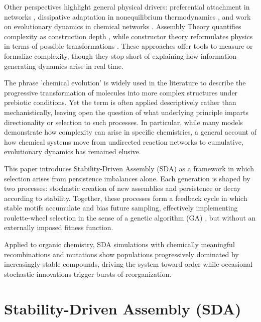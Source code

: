 \documentclass[life,article,submit,pdftex,moreauthors]{Definitions/mdpi}
\begin{document}
Other perspectives highlight general physical drivers: preferential attachment in networks \cite{barabasi1999emergence}, dissipative adaptation in nonequilibrium thermodynamics \cite{prigogine1977self, england2015dissipative}, and work on evolutionary dynamics in chemical networks \cite{wu2012origin, nowak2006evolutionary}. Assembly Theory quantifies complexity as construction depth \cite{walker2023nature}, while constructor theory reformulates physics in terms of possible transformations \cite{deutsch2013constructor}. These approaches offer tools to measure or formalize complexity, though they stop short of explaining how information-generating dynamics arise in real time.

The phrase 'chemical evolution' is widely used in the literature to describe the progressive transformation of molecules into more complex structures under prebiotic conditions. Yet the term is often applied descriptively rather than mechanistically, leaving open the question of what underlying principle imparts directionality or selection to such processes. In particular, while many models demonstrate how complexity can arise in specific chemistries, a general account of how chemical systems move from undirected reaction networks to cumulative, evolutionary dynamics has remained elusive.

This paper introduces Stability-Driven Assembly (SDA) as a framework in which 
selection arises from persistence imbalances alone. Each generation is shaped 
by two processes: stochastic creation of new assemblies and persistence or 
decay according to stability. Together, these processes form a feedback cycle
in which stable motifs accumulate and bias future sampling, effectively implementing roulette-wheel selection in the sense of a genetic algorithm (GA) 
\cite{holland1975adaptation, adler1993marriage}, but without an externally
imposed fitness function.

Applied to organic chemistry, SDA simulations with chemically meaningful
recombinations and mutations show populations progressively dominated by
increasingly stable compounds, driving the system toward order while
occasional stochastic innovations trigger bursts of reorganization.

\section{Stability-Driven Assembly (SDA)}
\end{document}
